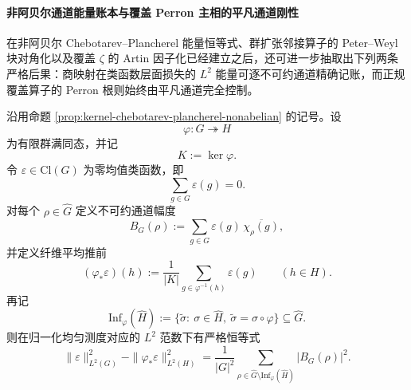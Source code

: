 \paragraph{非阿贝尔通道能量账本与覆盖 Perron 主相的平凡通道刚性}
在非阿贝尔 Chebotarev--Plancherel 能量恒等式、群扩张邻接算子的 Peter--Weyl 块对角化以及覆盖 \(\zeta\) 的 Artin 因子化已经建立之后，还可进一步抽取出下列两条严格后果：商映射在类函数层面损失的 \(L^2\) 能量可逐不可约通道精确记账，而正规覆盖算子的 Perron 根则始终由平凡通道完全控制。

\begin{theorem}[非阿贝尔商映射的精确能量损失公式]\label{thm:xi-time-part64-nonabelian-quotient-energy-loss-exact}
沿用命题 \ref{prop:kernel-chebotarev-plancherel-nonabelian} 的记号。设
\[
\varphi:G\twoheadrightarrow H
\]
为有限群满同态，并记
\[
K:=\ker\varphi.
\]
令 \(\varepsilon\in \mathrm{Cl}(G)\) 为零均值类函数，即
\[
\sum_{g\in G}\varepsilon(g)=0.
\]
对每个 \(\rho\in\widehat G\) 定义不可约通道幅度
\[
B_G(\rho):=\sum_{g\in G}\varepsilon(g)\,\overline{\chi_\rho(g)},
\]
并定义纤维平均推前
\[
(\varphi_\ast\varepsilon)(h):=\frac1{|K|}\sum_{g\in\varphi^{-1}(h)}\varepsilon(g)
\qquad(h\in H).
\]
再记
\[
\mathrm{Inf}_\varphi(\widehat H)
:=
\{\widetilde \sigma:\ \sigma\in \widehat H,\ \widetilde \sigma=\sigma\circ\varphi\}
\subseteq \widehat G.
\]
则在归一化均匀测度对应的 \(L^2\) 范数下有严格恒等式
\[
\boxed{\;
\|\varepsilon\|_{L^2(G)}^2-\|\varphi_\ast\varepsilon\|_{L^2(H)}^2
=
\frac1{|G|^2}
\sum_{\rho\in\widehat G\setminus \mathrm{Inf}_\varphi(\widehat H)}
\bigl|B_G(\rho)\bigr|^2.\;}
\]
\end{theorem}
